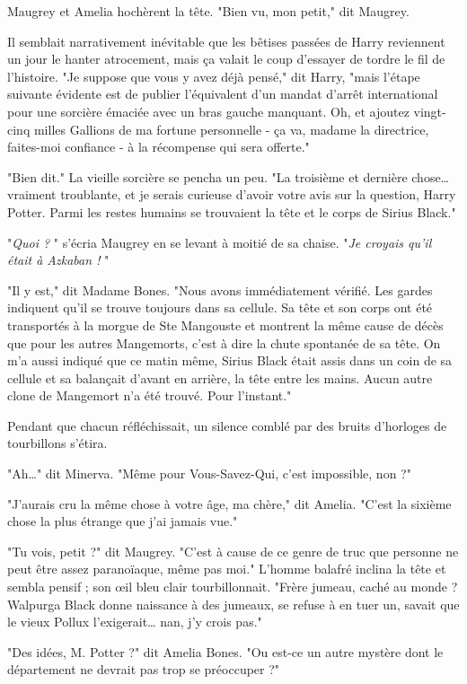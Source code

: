 Maugrey et Amelia hochèrent la tête. "Bien vu, mon petit," dit Maugrey.

Il semblait narrativement inévitable que les bêtises passées de Harry reviennent un jour le hanter atrocement, mais ça valait le coup d'essayer de tordre le fil de l'histoire. "Je suppose que vous y avez déjà pensé," dit Harry, "mais l'étape suivante évidente est de publier l'équivalent d'un mandat d'arrêt international pour une sorcière émaciée avec un bras gauche manquant. Oh, et ajoutez vingt-cinq milles Gallions de ma fortune personnelle - ça va, madame la directrice, faites-moi confiance - à la récompense qui sera offerte."

"Bien dit." La vieille sorcière se pencha un peu. "La troisième et dernière chose… vraiment troublante, et je serais curieuse d'avoir votre avis sur la question, Harry Potter. Parmi les restes humains se trouvaient la tête et le corps de Sirius Black."

"\emph{Quoi ?} " s'écria Maugrey en se levant à moitié de sa chaise. "\emph{Je croyais qu'il était à Azkaban !} "

"Il y est," dit Madame Bones. "Nous avons immédiatement vérifié. Les gardes indiquent qu'il se trouve toujours dans sa cellule. Sa tête et son corps ont été transportés à la morgue de Ste Mangouste et montrent la même cause de décès que pour les autres Mangemorts, c'est à dire la chute spontanée de sa tête. On m'a aussi indiqué que ce matin même, Sirius Black était assis dans un coin de sa cellule et sa balançait d'avant en arrière, la tête entre les mains. Aucun autre clone de Mangemort n'a été trouvé. Pour l'instant."

Pendant que chacun réfléchissait, un silence comblé par des bruits d'horloges de tourbillons s'étira.

"Ah…" dit Minerva. "Même pour Vous-Savez-Qui, c'est impossible, non ?"

"J'aurais cru la même chose à votre âge, ma chère," dit Amelia. "C'est la sixième chose la plus étrange que j'ai jamais vue."

"Tu vois, petit ?" dit Maugrey. "C'est à cause de ce genre de truc que personne ne peut être assez paranoïaque, même pas moi." L'homme balafré inclina la tête et sembla pensif ; son œil bleu clair tourbillonnait. "Frère jumeau, caché au monde ? Walpurga Black donne naissance à des jumeaux, se refuse à en tuer un, savait que le vieux Pollux l'exigerait… nan, j'y crois pas."

"Des idées, M. Potter ?" dit Amelia Bones. "Ou est-ce un autre mystère dont le département ne devrait pas trop se préoccuper ?"

